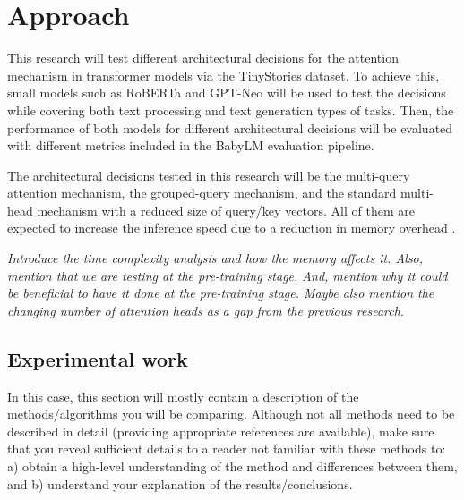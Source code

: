 \section{Approach}



This research will test different architectural decisions for the attention mechanism in transformer models via the TinyStories dataset. To achieve this, small models such as RoBERTa\footnotemark[1]{} and GPT-Neo\footnotemark[2]{} will be used to test the decisions while covering both text processing and text generation types of tasks. Then, the performance of both models for different architectural decisions will be evaluated with different metrics included in the BabyLM evaluation pipeline\footnotemark[3]{}.

The architectural decisions tested in this research will be the multi-query attention mechanism, the grouped-query mechanism, and the standard multi-head mechanism with a reduced size of query/key vectors. All of them are expected to increase the inference speed due to a reduction in memory overhead \cite{ainslie_gqa_2023} \cite{shazeer_fast_2019}. 

\textit{Introduce the time complexity analysis and how the memory affects it. Also, mention that we are testing at the pre-training stage. And, mention why it could be beneficial to have it done at the pre-training stage. Maybe also mention the changing number of attention heads as a gap from the previous research.}


\subsection*{Experimental work}
In this case, this section will mostly contain a description of the methods/algorithms you will be comparing. Although not all methods need to be described in detail (providing appropriate references are available), make sure that you reveal sufficient details to a reader not familiar with these methods to: a) obtain a high-level understanding of the method and differences between them, and b) understand your explanation of the results/conclusions.

